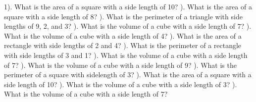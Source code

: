 \documentclass{article}%
\begin{document}
1). What is the area of a square with a side length of 10?%
\newline%
\newline%
). What is the area of a square with a side length of 8?%
\newline%
\newline%
). What is the perimeter of a triangle with side lengths of 9, 2, and 3?%
\newline%
\newline%
). What is the volume of a cube with a side length of 7?%
\newline%
\newline%
). What is the volume of a cube with a side length of 4?%
\newline%
\newline%
). What is the area of a rectangle with side lengths of 2 and 4?%
\newline%
\newline%
). What is the perimeter of a rectangle with side lengths of 3 and 1?%
\newline%
\newline%
). What is the volume of a cube with a side length of 7?%
\newline%
\newline%
). What is the volume of a cube with a side length of 9?%
\newline%
\newline%
). What is the perimeter of a square with sidelength of 3?%
\newline%
\newline%
). What is the area of a square with a side length of 10?%
\newline%
\newline%
). What is the volume of a cube with a side length of 3?%
\newline%
\newline%
). What is the volume of a cube with a side length of 7?%
\end{document}
